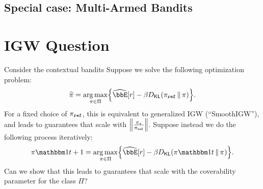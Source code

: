 \documentclass{article}
\begin{document}
\subsection{Special case: Multi-Armed Bandits}

\section{IGW Question}
Consider the contextual bandits
Suppose we solve the following optimization problem:
\[
  \pihat=\argmax_{\pi\in\Pi}\crl*{
    \Eh\brk*{r} - \beta\Dkl{\piref}{\pi}}.
\]
For a fixed choice of $\piref$, this is equivalent to generalized IGW
(``SmoothIGW''), and leads to guarantees that scale with
$\nrm*{\frac{\pistar}{\piref}}$. Suppose instead we do the following
process iteratively:
\[
  \pi\ind{t+1}=\argmax_{\pi\in\Pi}\crl*{
    \Eh\brk*{r} - \beta\Dkl{\pi\ind{t}}{\pi}}.
\]
Can we show that this leads to guarantees that scale with the
coverability parameter for the class $\Pi$?


 
\end{document}
